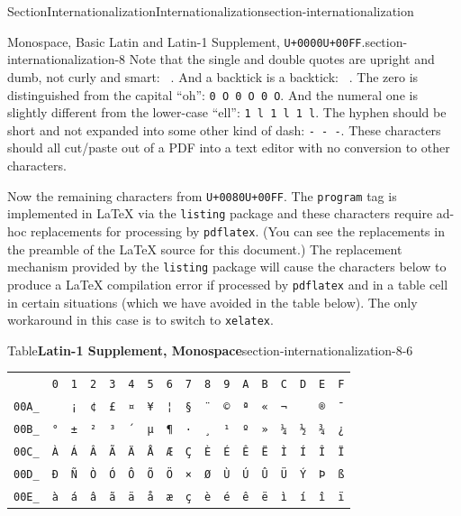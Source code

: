 \documentclass[twoside,10pt,]{article}
\newcommand{\tabularfont}{\relax}
\newcommand{\mono}[1]{\texttt{#1}}
\numberwithin{equation}{section}
\begin{document}
\begin{sectionptx}{Section}{Internationalization}{}{Internationalization}{}{}{section-internationalization}
\begin{paragraphs}{Monospace, Basic Latin and Latin-1 Supplement, \mono{U+0000}\textendash{}\mono{U+00FF}.}{section-internationalization-8}
Note that the single and double quotes are upright and dumb, not curly and smart: \mono{\textquotesingle{} \textquotedbl{} \textquotesingle{} \textquotedbl{} \textquotesingle{} \textquotedbl{}}.  And a backtick is a backtick: \mono{\textasciigrave{} \textasciigrave{} \textasciigrave{}}.  The zero is distinguished from the capital ``oh'': \mono{0 O 0 O 0 O}.  And the numeral one is slightly different from the lower-case ``ell'': \mono{1 l 1 l 1 l}.  The hyphen should be short and not expanded into some other kind of dash: \mono{- - -}.  These characters should all cut\slash{}paste out of a PDF into a text editor with no conversion to other characters.%
\par
Now the remaining characters from \mono{U+0080}\textendash{}\mono{U+00FF}.  The \mono{program} tag is implemented in \LaTeX{} via the \mono{listing} package and these characters require ad-hoc replacements for processing by \mono{pdflatex}.  (You can see the replacements in the preamble of the \LaTeX{} source for this document.)  The replacement mechanism provided by the \mono{listing} package will cause the characters below to produce a \LaTeX{} compilation error if processed by \mono{pdflatex} and in a table cell in certain situations (which we have avoided in the table below).  The only workaround in this case is to switch to \mono{xelatex}.%
\begin{tableptx}{Table}{\textbf{Latin-1 Supplement, Monospace}}{section-internationalization-8-6}{}%
\centering%
{\tabularfont%
\begin{tabular}{lllllllllllllllll}
&\mono{0}&\mono{1}&\mono{2}&\mono{3}&\mono{4}&\mono{5}&\mono{6}&\mono{7}&\mono{8}&\mono{9}&\mono{A}&\mono{B}&\mono{C}&\mono{D}&\mono{E}&\mono{F}\tabularnewline[0pt]
\mono{00A\_}&&\mono{¡}&\mono{¢}&\mono{£}&\mono{¤}&\mono{¥}&\mono{¦}&\mono{§}&\mono{¨}&\mono{©}&\mono{ª}&\mono{«}&\mono{¬}&&\mono{®}&\mono{¯}\tabularnewline[0pt]
\mono{00B\_}&\mono{°}&\mono{±}&\mono{²}&\mono{³}&\mono{´}&\mono{µ}&\mono{¶}&\mono{·}&\mono{¸}&\mono{¹}&\mono{º}&\mono{»}&\mono{¼}&\mono{½}&\mono{¾}&\mono{¿}\tabularnewline[0pt]
\mono{00C\_}&\mono{À}&\mono{Á}&\mono{Â}&\mono{Ã}&\mono{Ä}&\mono{Å}&\mono{Æ}&\mono{Ç}&\mono{È}&\mono{É}&\mono{Ê}&\mono{Ë}&\mono{Ì}&\mono{Í}&\mono{Î}&\mono{Ï}\tabularnewline[0pt]
\mono{00D\_}&\mono{Ð}&\mono{Ñ}&\mono{Ò}&\mono{Ó}&\mono{Ô}&\mono{Õ}&\mono{Ö}&\mono{×}&\mono{Ø}&\mono{Ù}&\mono{Ú}&\mono{Û}&\mono{Ü}&\mono{Ý}&\mono{Þ}&\mono{ß}\tabularnewline[0pt]
\mono{00E\_}&\mono{à}&\mono{á}&\mono{â}&\mono{ã}&\mono{ä}&\mono{å}&\mono{æ}&\mono{ç}&\mono{è}&\mono{é}&\mono{ê}&\mono{ë}&\mono{ì}&\mono{í}&\mono{î}&\mono{ï}\tabularnewline[0pt]

\end{tabular}}
\end{tableptx}
\end{paragraphs}
\end{sectionptx}
\end{document}
